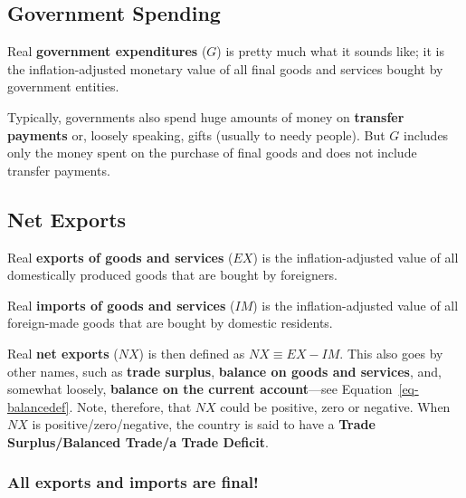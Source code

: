 \documentclass[
  letterpaper,
]{book}
\begin{document}
\subsection{Government Spending}\label{sec-government-spending-nia}


Real \textbf{government expenditures} (\(G\)) is pretty much what it
sounds like; it is the inflation-adjusted monetary value of all final
goods and services bought by government entities.

Typically, governments also spend huge amounts of money on
\textbf{transfer payments} or, loosely speaking, gifts (usually to needy
people). But \(G\) includes only the money spent on the purchase of
final goods and does not include transfer payments.

\subsection{Net Exports}\label{sec-netexports-nia}


Real \textbf{exports of goods and services} (\(EX\)) is the
inflation-adjusted value of all domestically produced goods that are
bought by foreigners.

Real \textbf{imports of goods and services} (\(IM\)) is the
inflation-adjusted value of all foreign-made goods that are bought by
domestic residents.

Real \textbf{net exports} (\(NX\)) is then defined as
\(NX\equiv EX-IM\). This also goes by other names, such as \textbf{trade
surplus}, \textbf{balance on goods and services}, and, somewhat loosely,
\textbf{balance on the current account}---see
Equation~\ref{eq-balancedef}.
Note, therefore, that \(NX\) could be positive, zero or negative. When
\(NX\) is positive/zero/negative, the country is said to have a
\textbf{Trade Surplus/Balanced Trade/a Trade Deficit}.

\subsubsection{All exports and imports are
final!}\label{sec-exp-imp-final}
\end{document}
